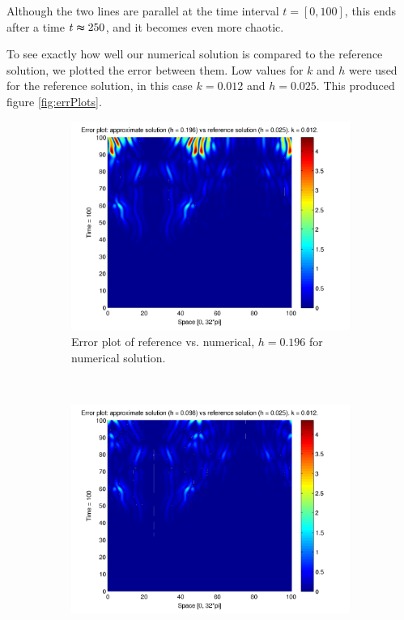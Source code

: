 Although the two lines are parallel at the time interval $t = [0,100]$, this ends after a time $t \thickapprox 250$, and it becomes even more chaotic.

To see exactly how well our numerical solution is compared to the reference solution, we plotted the error between them. Low values for $k$ and $h$ were used for the reference solution, in this case $k = 0.012$ and $h = 0.025$. This produced figure \ref{fig:errPlots}.

\begin{figure}[H]
        \centering
        \begin{subfigure}[b]{0.52\textwidth}
                \includegraphics[width=\textwidth]{../PDFs/IMEX/errPlots_worst_scaled.pdf}
                \caption{Error plot of reference vs. numerical, $h = 0.196$ for numerical solution.}
                \label{fig:highError}
        \end{subfigure}%
        ~ %
        \begin{subfigure}[b]{0.52\textwidth}
                \includegraphics[width=\textwidth]{../PDFs/IMEX/errPlots_best_scaled.pdf}

\end{subfigure}
\end{figure}
